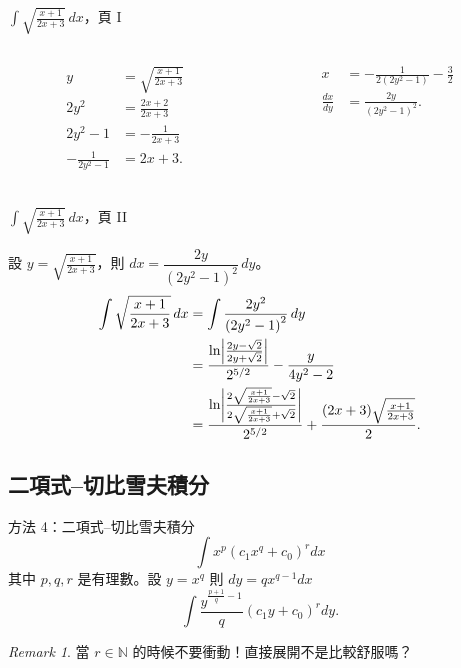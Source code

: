 \documentclass{beamer}
\newcommand{\Left} {\mathopen{}\mathclose\bgroup\left}
\newcommand{\Right}{\aftergroup\egroup\right}
\newcommand{\N}{\mathbb N}
\theoremstyle{remark}
\newtheorem{remark}{Remark}
\begin{document}
\begin{CJK}{UTF8}{bsmi}
\begin{frame}{$\displaystyle \int \sqrt{\frac{x+1}{2x+3}}\,dx$，頁 I}
  \begin{columns}
    \begin{column}{0.5\textwidth}
      \begin{align*}
	y &= \sqrt{\frac{x+1}{2x+3}}\\
	2y^2 &= \frac{2x+2}{2x+3}\\
	2y^2 - 1 &= -\frac{1}{2x+3}\\
	-\frac{1}{2y^2 - 1} &= 2x+3.\\
      \end{align*}
    \end{column}
    \begin{column}{0.5\textwidth}
      \begin{align*}
	x &= -\frac{1}{2 \left( 2y^2 - 1 \right)} - \frac32\\
	\frac{dx}{dy} &= \frac{2y}{\left( 2y^2 - 1 \right)^2}.
      \end{align*}
    \end{column}
  \end{columns}
\end{frame}

\begin{frame}{$\displaystyle \int \sqrt{\frac{x+1}{2x+3}}\,dx$，頁 II}
  \begin{solution}
    設 $\displaystyle y = \sqrt{\frac{x+1}{2x+3}}$，則 $dx = \dfrac{2y}{\left( 2y^2 - 1 \right)^2}\,dy$。
    \begin{align*}
      \int \sqrt{\frac{x+1}{2x+3}}\,dx &= \int \frac{2y^2}{\left( 2y^2 - 1 \right)^2}\,dy  \qquad \\
	&= \frac{\ln \Left| \frac{2y - \sqrt2}{2y + \sqrt2} \Right|}{2^{5/2}} - \frac{y}{4y^2 - 2}\\
	&= \frac{\ln \Left| \frac{2\sqrt{\frac{x+1}{2x+3}} - \sqrt2}{2\sqrt{\frac{x+1}{2x+3}} + \sqrt2} \Right|}{2^{5/2}}
	  + \frac{(2x+3) \sqrt{\frac{x+1}{2x+3}}}{2}.
    \end{align*}
  \end{solution}
\end{frame}

\subsection[切比雪夫積分]{二項式--切比雪夫積分}
\begin{frame}{方法 4：二項式--切比雪夫積分}
  \[\int x^p \left( c_1 x^q + c_0 \right)^r dx\]
  其中 $p,q,r$ 是有理數。設 $y = x^q$ 則 $dy = qx^{q-1} dx$
  \[\int \frac{y^{\frac{p+1}{q}-1}}{q} \left( c_1 y + c_0 \right)^r dy.\]
  \begin{remark}
    當 $r \in \N$ 的時候不要衝動！直接展開不是比較舒服嗎？
  \end{remark}
\end{frame}


\end{CJK}
\end{document}
